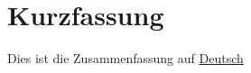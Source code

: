 \section*{Kurzfassung}
\label{sec:kurzfassung}

Dies ist die Zusammenfassung auf \underline{Deutsch}
